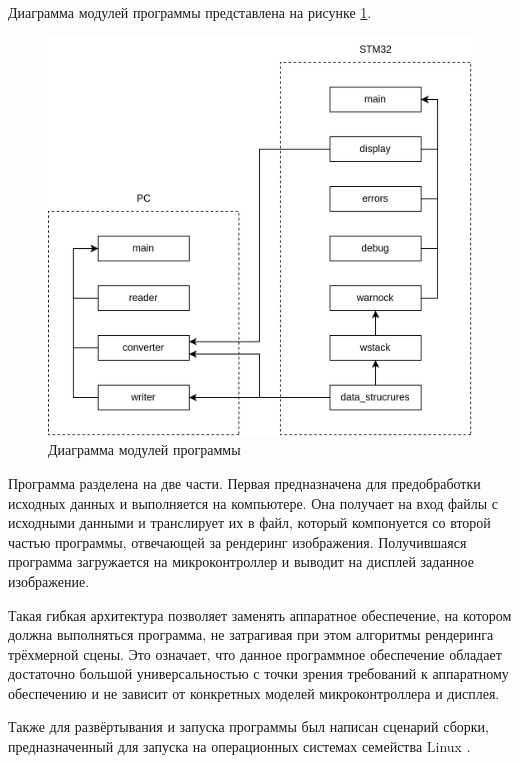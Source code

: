 Диаграмма модулей программы представлена на рисунке \ref{fig:modules}.

\begin{figure}[h]
	\centering
	\includegraphics[width=\textwidth ]{img/modules/modules.png}
	\caption{Диаграмма модулей программы}
	\label{fig:modules}
\end{figure} 

Программа разделена на две части. Первая предназначена для предобработки исходных данных и выполняется на компьютере. Она получает на вход 
файлы с исходными данными и транслирует их в файл, который компонуется со второй частью программы, отвечающей за рендеринг изображения. 
Получившаяся программа загружается на микроконтроллер и выводит на дисплей заданное изображение.

Такая гибкая архитектура позволяет заменять аппаратное обеспечение, на котором должна выполняться программа, не затрагивая при этом 
алгоритмы рендеринга трёхмерной сцены. Это означает, что данное программное обеспечение обладает достаточно большой универсальностью
с точки зрения требований к аппаратному обеспечению и не зависит от конкретных моделей микроконтроллера и дисплея.

Также для развёртывания и запуска программы был написан сценарий сборки, предназначенный для запуска на операционных системах 
семейства Linux \cite{linux}.



